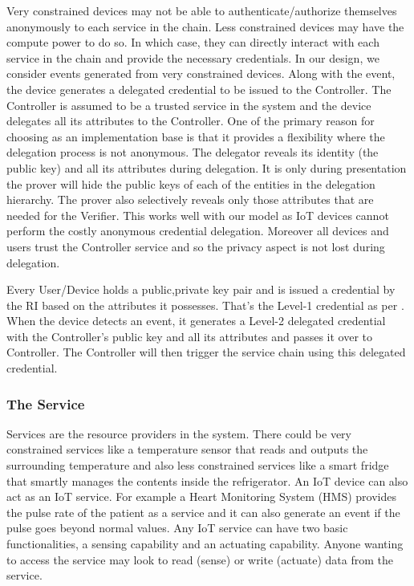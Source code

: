 \documentclass[journal]{IEEEtran}
\begin{document}
Very constrained devices may not be able to authenticate/authorize themselves anonymously to each service in the chain. Less constrained devices may have the compute power to do so. In which case, they can directly interact with each service in the chain and provide the necessary credentials. In our design, we consider events generated from very constrained devices. Along with the event, the device generates a delegated credential to be issued to the Controller. The Controller is assumed to be a trusted service in the system and the device delegates all its attributes to the Controller. One of the primary reason for choosing \citep{CamenischDD17} as an implementation base is that it provides a flexibility where the delegation process is not anonymous. The delegator reveals its identity (the public key) and all its attributes during delegation. It is only during presentation the prover will hide the public keys of each of the entities in the delegation hierarchy. The prover also selectively reveals only those attributes that are needed for the Verifier. This works well with our model as IoT devices cannot perform the costly anonymous credential delegation. Moreover all devices and users trust the Controller service and so the privacy aspect is not lost during delegation.

Every User/Device holds a public,private key pair and is issued a credential by the RI based on the attributes it possesses. That's the Level-1 credential as per \cite{CamenischDD17}. When the device detects an event, it generates a Level-2 delegated credential with the Controller's public key and all its attributes and passes it over to Controller. The Controller will then trigger the service chain using this delegated credential.

\subsubsection{The Service} \label{service}
Services are the resource providers in the system. There could be very constrained services like a temperature sensor that reads and outputs the surrounding temperature and also less constrained services like a smart fridge that smartly manages the contents inside the refrigerator. An IoT device can also act as an IoT service. For example a Heart Monitoring System (HMS) provides the pulse rate of the patient as a service and it can also generate an event if the pulse goes beyond normal values. Any IoT service can have two basic functionalities, a sensing capability and an actuating capability. Anyone wanting to access the service may look to read (sense) or write (actuate) data from the service.
\end{document}
